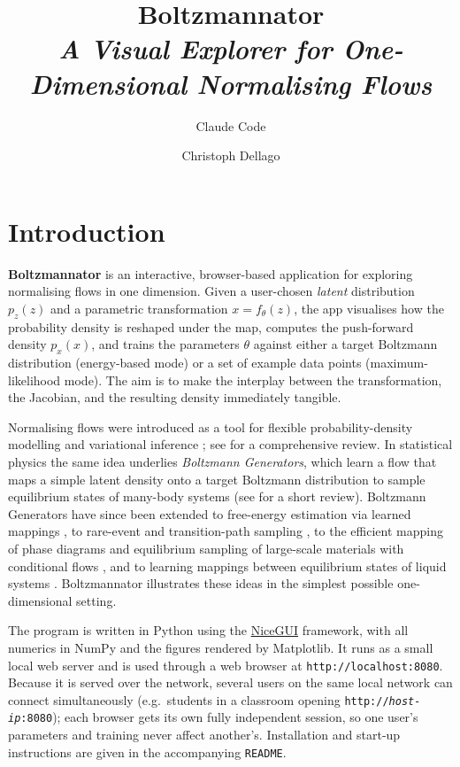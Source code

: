 \documentclass[11pt,a4paper]{article}
\title{\textbf{Boltzmannator}\\[4pt]
       \large {\em A Visual Explorer for One-Dimensional Normalising Flows}}
\author[1]{Claude Code}
\author[2]{Christoph Dellago}
\affil[1]{Anthropic}
\affil[2]{Faculty of Physics, University of Vienna}
\date{}
\newcommand{\pz}{p_z}
\newcommand{\px}{p_x}
\newcommand{\ft}{f_{\!\theta}}
\newcommand{\param}{\theta}
\begin{document}
\maketitle
\tableofcontents
\bigskip

\section{Introduction}

\textbf{Boltzmannator} is an interactive, browser-based application for
exploring normalising flows in one dimension.  Given a user-chosen
\emph{latent} distribution $\pz(z)$ and a parametric transformation
$x = \ft(z)$, the app visualises how the probability density is reshaped
under the map, computes the push-forward density $\px(x)$, and trains the
parameters $\param$ against either a target Boltzmann distribution
(energy-based mode) or a set of example data points (maximum-likelihood
mode).  The aim is to make the interplay between the transformation, the
Jacobian, and the resulting density immediately tangible.

Normalising flows were introduced as a tool for flexible probability-density
modelling and variational inference \cite{rezende2015}; see
\cite{papamakarios2021} for a comprehensive review.  In statistical physics
the same idea underlies \emph{Boltzmann Generators}, which learn a flow that
maps a simple latent density onto a target Boltzmann distribution to sample
equilibrium states of many-body systems \cite{noe2019boltzmann} (see
\cite{coretti2024kimreview} for a short review).  Boltzmann Generators have
since been extended to free-energy estimation via learned mappings
\cite{wirnsberger2020}, to rare-event and transition-path sampling
\cite{falkner2023}, to the efficient mapping of phase diagrams and equilibrium
sampling of large-scale materials with conditional flows
\cite{schebek2024,schebek2025}, and to learning mappings between equilibrium
states of liquid systems \cite{coretti2025jcp}.  Boltzmannator illustrates
these ideas in the simplest possible one-dimensional setting.

The program is written in Python using the \href{https://nicegui.io}{NiceGUI}
framework, with all numerics in NumPy and the figures rendered by Matplotlib.
It runs as a small local web server and is used through a web browser at
\texttt{http://localhost:8080}.  Because it is served over the network, several
users on the same local network can connect simultaneously (e.g.\ students in a
classroom opening \texttt{http://\textit{host-ip}:8080}); each browser gets its
own fully independent session, so one user's parameters and training never
affect another's.  Installation and start-up instructions are given in the
accompanying \texttt{README}.
\end{document}
